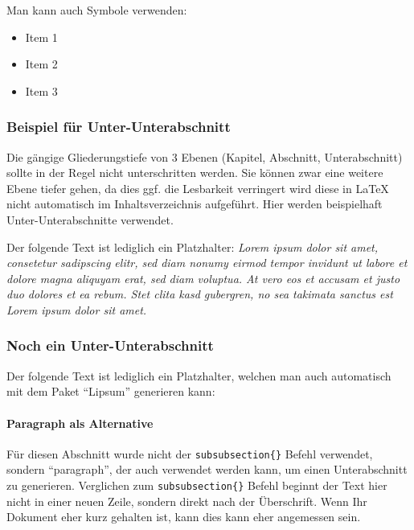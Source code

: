 Man kann auch Symbole verwenden:

\begin{itemize}
\renewcommand{\labelitemi}{$\rightarrow$}
	\item Item 1
	\item Item 2
	\item Item 3
\end{itemize}

\subsubsection{Beispiel für Unter-Unterabschnitt} %
\label{ssub:bsp_unterunterabschnitt}
Die gängige Gliederungstiefe von 3 Ebenen (Kapitel, Abschnitt, Unterabschnitt) sollte in der Regel nicht unterschritten werden. Sie können zwar eine weitere Ebene tiefer gehen, da dies ggf. die Lesbarkeit verringert wird diese in \LaTeX{} nicht automatisch im Inhaltsverzeichnis aufgeführt. Hier werden beispielhaft Unter-Unterabschnitte verwendet. 

Der folgende Text ist lediglich ein Platzhalter: \emph{Lorem ipsum dolor sit amet, consetetur sadipscing elitr, sed diam nonumy eirmod tempor invidunt ut labore et dolore magna aliquyam erat, sed diam voluptua. At vero eos et accusam et justo duo dolores et ea rebum. Stet clita kasd gubergren, no sea takimata sanctus est Lorem ipsum dolor sit amet.}


\subsubsection{Noch ein Unter-Unterabschnitt}
Der folgende Text ist lediglich ein Platzhalter, welchen man auch automatisch mit dem Paket ``Lipsum'' generieren kann: 
\textit{\lipsum[1]}	

\paragraph{Paragraph als Alternative} %
\label{par:paragraph_als_alternative}
Für diesen Abschnitt wurde nicht der \texttt{subsubsection\{\}} Befehl verwendet, sondern ``paragraph'', der auch verwendet werden kann, um einen Unterabschnitt zu generieren. Verglichen zum \texttt{subsubsection\{\}} Befehl beginnt der Text hier nicht in einer neuen Zeile, sondern direkt nach der Überschrift. Wenn Ihr Dokument eher kurz gehalten ist, kann dies kann eher angemessen sein.

